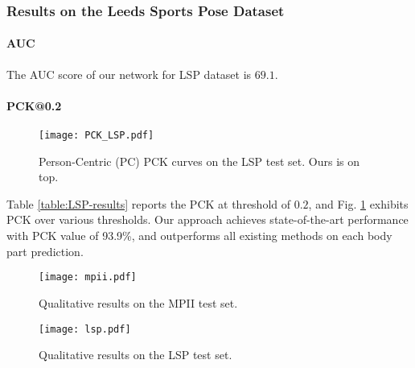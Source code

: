 \documentclass[journal ]{IEEEtran}
\begin{document}
\subsubsection{Results on the Leeds Sports Pose Dataset}

\paragraph{AUC}
The AUC score of our network for LSP dataset is $69.1$.

\paragraph{PCK@0.2}

\begin{figure}[h]
	\begin{center}
		\texttt{[image: PCK\_LSP.pdf]}
	\end{center}
	\caption{Person-Centric (PC) PCK curves on the LSP test set. Ours is on top.}
	\label{fig:pck}
\end{figure}

Table \ref{table:LSP-results} reports the PCK at threshold of $0.2$, and Fig. \ref{fig:pck} exhibits PCK over various thresholds. Our approach achieves state-of-the-art performance with PCK value of 93.9\%, and outperforms all existing methods on each body part prediction. 

\begin{figure*}[t]
	\centering 
	\begin{center}
		\texttt{[image: mpii.pdf]}
		\caption{Qualitative results on the MPII test set.}
	\end{center}
\label{fig:mpii}
\end{figure*}

\begin{figure*}[h]
	\begin{center}
		\texttt{[image: lsp.pdf]}
	\end{center}
	\caption{Qualitative results on the LSP test set.}
	\label{fig:lsp}
\end{figure*}
\end{document}

